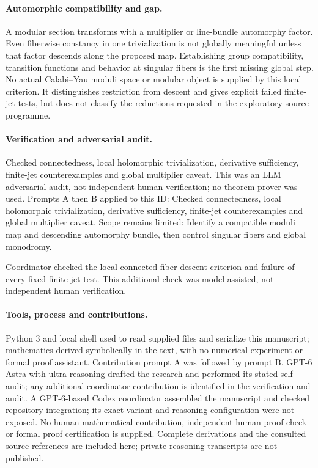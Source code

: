\documentclass[11pt]{article}
\begin{document}
\paragraph{Automorphic compatibility and gap.}A modular section transforms with a multiplier or line-bundle automorphy factor. Even fiberwise constancy in one trivialization is not globally meaningful unless that factor descends along the proposed map. Establishing group compatibility, transition functions and behavior at singular fibers is the first missing global step. No actual Calabi--Yau moduli space or modular object is supplied by this local criterion. It distinguishes restriction from descent and gives explicit failed finite-jet tests, but does not classify the reductions requested in the exploratory source programme.

\paragraph{Verification and adversarial audit.}
Checked connectedness, local holomorphic trivialization, derivative sufficiency, finite-jet counterexamples and global multiplier caveat. This was an LLM adversarial audit, not independent human verification; no theorem prover was used. Prompts A then B applied to this ID: Checked connectedness, local holomorphic trivialization, derivative sufficiency, finite-jet counterexamples and global multiplier caveat. Scope remains limited: Identify a compatible moduli map and descending automorphy bundle, then control singular fibers and global monodromy.

Coordinator checked the local connected-fiber descent criterion and failure of every fixed finite-jet test. This additional check was model-assisted, not independent human verification.

\paragraph{Tools, process and contributions.}
Python 3 and local shell used to read supplied files and serialize this manuscript; mathematics derived symbolically in the text, with no numerical experiment or formal proof assistant. Contribution prompt A was followed by prompt B. GPT-6 Astra with ultra reasoning drafted the research and performed its stated self-audit; any additional coordinator contribution is identified in the verification and audit. A GPT-6-based Codex coordinator assembled the manuscript and checked repository integration; its exact variant and reasoning configuration were not exposed. No human mathematical contribution, independent human proof check or formal proof certification is supplied. Complete derivations and the consulted source references are included here; private reasoning transcripts are not published.
\end{document}
